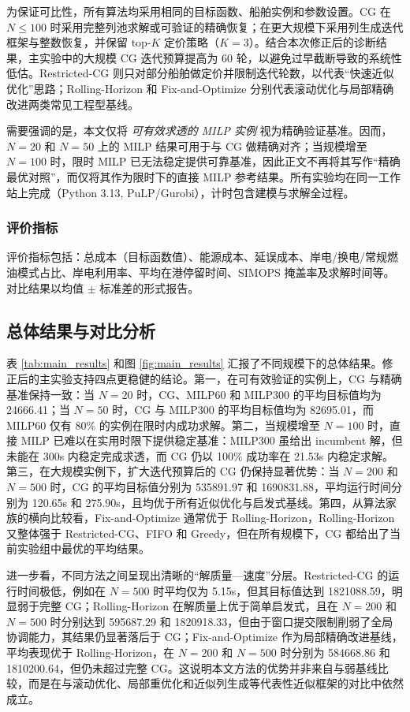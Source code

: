 \documentclass[UTF8, a4paper, 12pt]{ctexart}
\begin{document}
为保证可比性，所有算法均采用相同的目标函数、船舶实例和参数设置。CG 在 $N\le 100$ 时采用完整列池求解或可验证的精确恢复；在更大规模下采用列生成迭代框架与整数恢复，并保留 top-$K$ 定价策略（$K=3$）。结合本次修正后的诊断结果，主实验中的大规模 CG 迭代预算提高为 60 轮，以避免过早截断导致的系统性低估。Restricted-CG 则只对部分船舶做定价并限制迭代轮数，以代表“快速近似优化”思路；Rolling-Horizon 和 Fix-and-Optimize 分别代表滚动优化与局部精确改进两类常见工程型基线。

需要强调的是，本文仅将 \emph{可有效求透的 MILP 实例} 视为精确验证基准。因而，$N=20$ 和 $N=50$ 上的 MILP 结果可用于与 CG 做精确对齐；当规模增至 $N=100$ 时，限时 MILP 已无法稳定提供可靠基准，因此正文不再将其写作“精确最优对照”，而仅将其作为限时下的直接 MILP 参考结果。所有实验均在同一工作站上完成（Python 3.13, PuLP/Gurobi），计时包含建模与求解全过程。

\subsubsection{评价指标}
\label{sec:metrics}
评价指标包括：总成本（目标函数值）、能源成本、延误成本、岸电/换电/常规燃油模式占比、岸电利用率、平均在港停留时间、SIMOPS 掩盖率及求解时间等。对比结果以均值 $\pm$ 标准差的形式报告。

\subsection{总体结果与对比分析}
\label{sec:overall_results}
表 \ref{tab:main_results} 和图 \ref{fig:main_results} 汇报了不同规模下的总体结果。修正后的主实验支持四点更稳健的结论。第一，在可有效验证的实例上，CG 与精确基准保持一致：当 $N=20$ 时，CG、MILP60 和 MILP300 的平均目标值均为 24666.41；当 $N=50$ 时，CG 与 MILP300 的平均目标值均为 82695.01，而 MILP60 仅有 80\% 的实例在限时内成功求解。第二，当规模增至 $N=100$ 时，直接 MILP 已难以在实用时限下提供稳定基准：MILP300 虽给出 incumbent 解，但未能在 300s 内稳定完成求透，而 CG 仍以 100\% 成功率在 21.53s 内稳定求解。第三，在大规模实例下，扩大迭代预算后的 CG 仍保持显著优势：当 $N=200$ 和 $N=500$ 时，CG 的平均目标值分别为 535891.97 和 1690831.88，平均运行时间分别为 120.65s 和 275.90s，且均优于所有近似优化与启发式基线。第四，从算法家族的横向比较看，Fix-and-Optimize 通常优于 Rolling-Horizon，Rolling-Horizon 又整体强于 Restricted-CG、FIFO 和 Greedy，但在所有规模下，CG 都给出了当前实验组中最优的平均结果。

进一步看，不同方法之间呈现出清晰的“解质量—速度”分层。Restricted-CG 的运行时间极低，例如在 $N=500$ 时平均仅为 5.15s，但其目标值达到 1821088.59，明显弱于完整 CG；Rolling-Horizon 在解质量上优于简单启发式，且在 $N=200$ 和 $N=500$ 时分别达到 595687.29 和 1820918.33，但由于窗口提交限制削弱了全局协调能力，其结果仍显著落后于 CG；Fix-and-Optimize 作为局部精确改进基线，平均表现优于 Rolling-Horizon，在 $N=200$ 和 $N=500$ 时分别为 584668.86 和 1810200.64，但仍未超过完整 CG。这说明本文方法的优势并非来自与弱基线比较，而是在与滚动优化、局部重优化和近似列生成等代表性近似框架的对比中依然成立。
\end{document}
